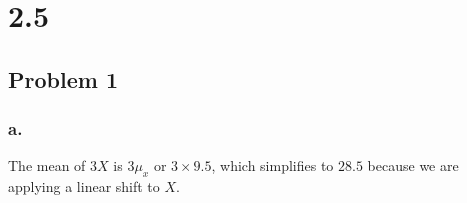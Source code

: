 \documentclass[11pt]{article}
\begin{document}
\begin{comment}
\subsubsection*{e.}
\[ P(0.7 - 0.4472 \le X\le 1) = \int_{0.7 - 0.4472}^{1} 1.2(x+x^2) dx \]
\[ P(0.7 - 0.4472 \le X\le 1) = 0.9552 \]


\subsubsection*{f.}
\[ F(X) = \int_{0}^{x} 1.2(a+a^2) da \]
\[ F(X) = (0.4x + 0.6) x^2  \]

\subsection*{Problem 25}
\subsubsection*{a.}
\[P(X\le2) = \int_{0}^{2}xe^{-x} dx \]
\[P(X\le2) = 0.5940 \]

\subsubsection*{b.}
\[ P(1.5 \le X \le 3) = \int_{1.5}^{3}xe^{-x} dx \]
\[ P(1.5 \le X \le 3) = 0.3587 \]

\subsubsection*{c.}
\[ \mu_x = \int_{0}^{\infty}x^2e^{-x} dx \]
\[ \mu_x = 2 \]

\subsubsection*{d.}
\[P(X\le2) = \int_{0}^{x}ae^{-a} da \]
\[P(X\le2) = 1 - e^{-x}(x+1) \]

\end{comment}

\section*{2.5}
\subsection*{Problem 1}
\subsubsection*{a.}
The mean of $3X$ is $3\mu_x$ or $3\times 9.5$, which simplifies to $28.5$
because we are applying a linear shift to $X$.
\end{document}
